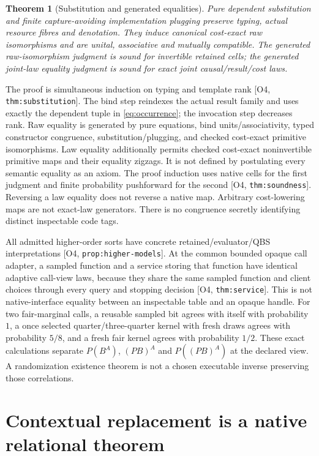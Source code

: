 \documentclass[11pt,a4paper]{article}
\newtheorem{theorem}{Theorem}[section]
\theoremstyle{definition}
\newcommand{\Addr}[2]{\textup{[#1, \texttt{#2}]}}
\begin{document}
\begin{theorem}[Substitution and generated equalities]\label{thm:language}
Pure dependent substitution and finite capture-avoiding implementation
plugging preserve typing, actual resource fibres and denotation. They
induce canonical cost-exact raw isomorphisms and are unital, associative
and mutually compatible. The generated raw-isomorphism judgment is
sound for invertible retained cells; the generated joint-law equality
judgment is sound for exact joint causal/result/cost laws.
\end{theorem}
The proof is simultaneous induction on typing and template rank
\Addr{O4}{thm:substitution}. The bind step reindexes the actual result
family and uses exactly the dependent tuple in \eqref{eq:occurrence};
the invocation step decreases rank. Raw equality is generated by pure
equations, bind units/associativity, typed constructor congruence,
substitution/plugging, and checked cost-exact primitive isomorphisms.
Law equality additionally permits checked cost-exact noninvertible primitive
maps and their equality zigzags. It is not defined by postulating every
semantic equality as an axiom. The proof induction uses native cells for
the first judgment and finite probability pushforward for the second
\Addr{O4}{thm:soundness}. Reversing a law equality does not reverse a
native map. Arbitrary cost-lowering maps are not exact-law generators.
There is no congruence secretly identifying distinct inspectable code tags.

All admitted higher-order sorts have concrete retained/evaluator/QBS
interpretations \Addr{O4}{prop:higher-models}. At the common bounded
opaque call adapter, a sampled function and a service storing that function
have identical adaptive call-view laws, because they share the same sampled
function and client choices through every query and stopping decision
\Addr{O4}{thm:service}. This is not native-interface equality between an
inspectable table and an opaque handle. For two fair-marginal calls, a
reusable sampled bit agrees with itself with probability \(1\), a once
selected quarter/three-quarter kernel with fresh draws agrees with
probability \(5/8\), and a fresh fair kernel agrees with probability
\(1/2\). These exact calculations separate \(P(B^A)\),
\((PB)^A\) and \(P((PB)^A)\) at the declared view. A randomization
existence theorem is not a chosen executable inverse preserving those
correlations.

\section{Contextual replacement is a native relational theorem}\label{sec:contextual}
\end{document}
